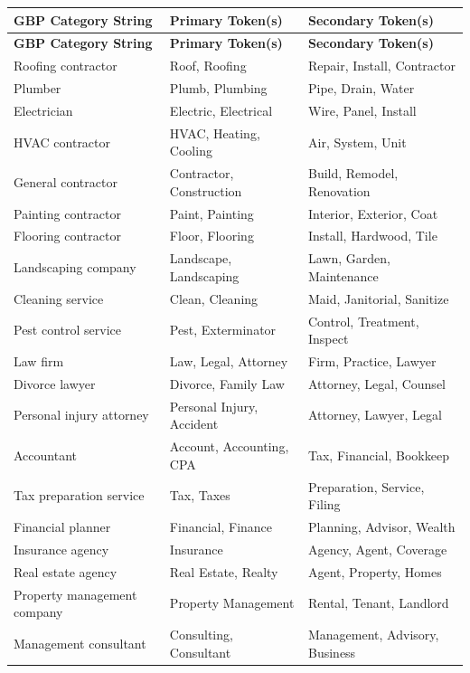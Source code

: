 \documentclass[12pt, openany]{book}
\theoremstyle{thmstyle}
\theoremstyle{defstyle}
\begin{document}
\begin{longtable}{p{2.2in}p{1.5in}p{2.0in}}
\toprule
\textbf{GBP Category String} & \textbf{Primary Token(s)} & \textbf{Secondary Token(s)} \\
\midrule
\endfirsthead
\toprule
\textbf{GBP Category String} & \textbf{Primary Token(s)} & \textbf{Secondary Token(s)} \\
\midrule
\endhead
\bottomrule
\endlastfoot
Roofing contractor & Roof, Roofing & Repair, Install, Contractor \\
Plumber & Plumb, Plumbing & Pipe, Drain, Water \\
Electrician & Electric, Electrical & Wire, Panel, Install \\
HVAC contractor & HVAC, Heating, Cooling & Air, System, Unit \\
General contractor & Contractor, Construction & Build, Remodel, Renovation \\
Painting contractor & Paint, Painting & Interior, Exterior, Coat \\
Flooring contractor & Floor, Flooring & Install, Hardwood, Tile \\
Landscaping company & Landscape, Landscaping & Lawn, Garden, Maintenance \\
Cleaning service & Clean, Cleaning & Maid, Janitorial, Sanitize \\
Pest control service & Pest, Exterminator & Control, Treatment, Inspect \\
Law firm & Law, Legal, Attorney & Firm, Practice, Lawyer \\
Divorce lawyer & Divorce, Family Law & Attorney, Legal, Counsel \\
Personal injury attorney & Personal Injury, Accident & Attorney, Lawyer, Legal \\
Accountant & Account, Accounting, CPA & Tax, Financial, Bookkeep \\
Tax preparation service & Tax, Taxes & Preparation, Service, Filing \\
Financial planner & Financial, Finance & Planning, Advisor, Wealth \\
Insurance agency & Insurance & Agency, Agent, Coverage \\
Real estate agency & Real Estate, Realty & Agent, Property, Homes \\
Property management company & Property Management & Rental, Tenant, Landlord \\
Management consultant & Consulting, Consultant & Management, Advisory, Business \\

\end{longtable}
\end{document}
